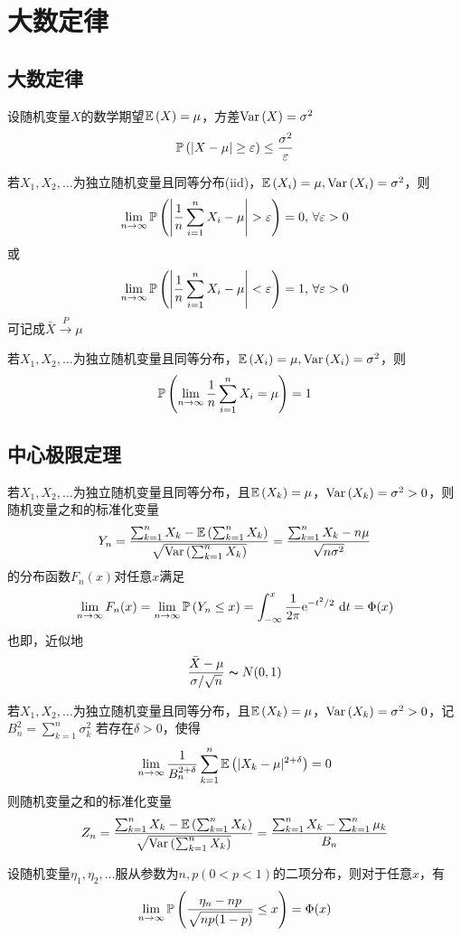 
\section{大数定律}
\subsection{大数定律}
\begin{theorem}
设随机变量$X$的数学期望$\mathbb{E}\left(X\right)=\mu$，方差$\mathrm{Var}\left(X\right)=\sigma^2$
\[\mathbb{P}\left(|X-\mu|\geq\varepsilon\right)\leq\dfrac{\sigma^2}{\varepsilon}\]
\end{theorem}
\begin{theorem}[弱大数定律(辛钦)]
若$X_1,X_2,\ldots$为独立随机变量且同等分布(iid)，$\mathbb{E}\left(X_i\right)=\mu,\mathrm{Var}\left(X_i\right)=\sigma^2$，则
\[\lim_{n\to\infty}\pr{\lra{\dfrac{1}{n}\sum_{i=1}^nX_i-\mu}>\eps}=0,\,\forall\eps>0\]
或
\[\lim_{n\to\infty}\mathbb{P}\left(\left|\dfrac{1}{n}\sum_{i=1}^nX_i-\mu\right|<\varepsilon\right)=1,\,\forall\varepsilon>0\]
可记成$\bar{X}\xrightarrow{P}\mu$
\end{theorem}
\begin{theorem}[强大数定律]
若$X_1,X_2,\ldots$为独立随机变量且同等分布，$\mathbb{E}\left(X_i\right)=\mu,\mathrm{Var}\left(X_i\right)=\sigma^2$，则
\[\mathbb{P}\left(\lim_{n\to\infty}\dfrac{1}{n}\sum_{i=1}^nX_i=\mu\right)=1\]
\end{theorem}

\subsection{中心极限定理}
\begin{theorem}[独立同分布的中心极限定理]
若$X_1,X_2,\ldots$为独立随机变量且同等分布，且$\mathbb{E}\left(X_k\right)=\mu$，$\mathrm{Var}\left(X_k\right)=\sigma^2>0$，则随机变量之和的标准化变量
\[Y_n=\frac{\sum_{k=1}^nX_k-\mathbb{E}\left(\sum_{k=1}^nX_k\right)}{\sqrt{\mathrm{Var}\left(\sum_{k=1}^nX_k\right)}}=\frac{\sum_{k=1}^nX_k-n\mu}{\sqrt{n\sigma^2}}\]
的分布函数$F_n(x)$对任意$x$满足
\[\lim_{n\to\infty}F_n(x)=\lim_{n\to\infty}\mathbb{P}\left(Y_n\leq x\right)=\displaystyle\int_{-\infty}^{x}{\frac{1}{2\pi}\mathrm{e}^{-t^2/2}}\,\,\mathrm{d} t=\Phi(x)\]
也即，近似地
\[\frac{\bar{X}-\mu}{\sigma/\sqrt{n}}\thicksim N(0,1)\]
\end{theorem}
\begin{theorem}
若$X_1,X_2,\ldots$为独立随机变量且同等分布，且$\mathbb{E}\left(X_k\right)=\mu$，$\mathrm{Var}\left(X_k\right)=\sigma^2>0$，记$B_n^2=\sum_{k=1}^n\sigma_k^2$
若存在$\delta>0$，使得
\[\lim_{n\to\infty}\frac{1}{B_n^{2+\delta}}\sum_{k=1}^n\mathbb{E}\left(|X_k-\mu|^{2+\delta}\right)=0\]
则随机变量之和的标准化变量
\[Z_n=\frac{\sum_{k=1}^nX_k-\mathbb{E}\left(\sum_{k=1}^nX_k\right)}{\sqrt{\mathrm{Var}\left(\sum_{k=1}^nX_k\right)}}=\frac{\sum_{k=1}^nX_k-\sum_{k=1}^n\mu_k}{B_n}\]
\end{theorem}
\begin{theorem}
设随机变量$\eta_1,\eta_2,\ldots$服从参数为$n,p(0<p<1)$的二项分布，则对于任意$x$，有
\[\lim_{n\to\infty}\mathbb{P}\left(\frac{\eta_n-np}{\sqrt{np(1-p)}}\leq x\right)=\Phi(x)\]
\end{theorem}